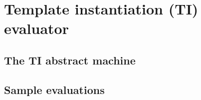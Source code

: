 \section{Template instantiation (TI) evaluator}
\label{sec:ti}

\subsection{The TI abstract machine}
\label{sec:ti-machine}

\subsection{Sample evaluations}
\label{sec:ti-examples}

